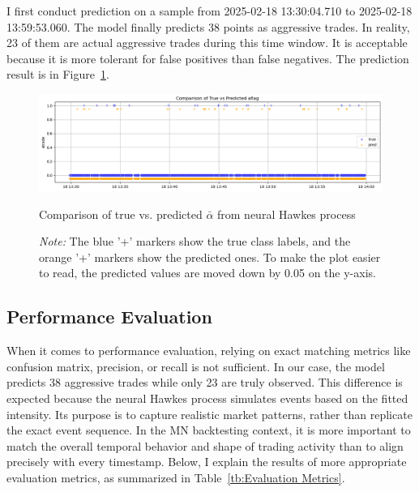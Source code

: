 I first conduct prediction on a sample from 2025-02-18 13:30:04.710 to 2025-02-18 13:59:53.060. The model finally predicts 38 points as aggressive trades. In reality, 23 of them are actual aggressive trades during this time window. It is acceptable because it is more tolerant for false positives than false negatives. The prediction result is in Figure~\ref{fig:nhp-aflag}.

\begin{figure}[H]
    \centering
    \includegraphics[width=0.9\linewidth]{figures/aflag_NHP_181330.png}
    \caption{Comparison of true vs. predicted $\bar{\alpha}$ from neural Hawkes process} 
    \caption*{\textit{Note:} The blue '+' markers show the true class labels, and the orange '+' markers show the predicted ones. To make the plot easier to read, the predicted values are moved down by 0.05 on the y-axis.
    }
    \label{fig:nhp-aflag}
\end{figure}



\subsection{Performance Evaluation}
When it comes to performance evaluation, relying on exact matching metrics like confusion matrix, precision, or recall is not sufficient. In our case, the model predicts 38 aggressive trades while only 23 are truly observed. This difference is expected because the neural Hawkes process simulates events based on the fitted intensity. Its purpose is to capture realistic market patterns, rather than replicate the exact event sequence. In the MN backtesting context, it is more important to match the overall temporal behavior and shape of trading activity than to align precisely with every timestamp. Below, I explain the results of more appropriate evaluation metrics, as summarized in Table~\ref{tb:Evaluation Metrics}.

